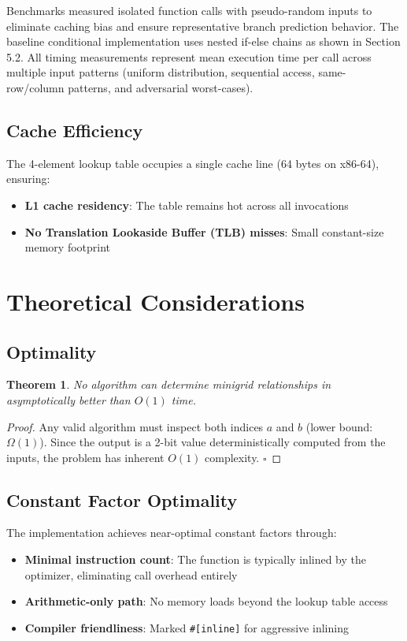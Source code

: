 \documentclass[11pt,a4paper]{article}
\newtheorem{theorem}{Theorem}
\begin{document}
Benchmarks measured isolated function calls with pseudo-random inputs to eliminate caching bias and ensure representative branch prediction behavior. The baseline conditional implementation uses nested if-else chains as shown in Section 5.2. All timing measurements represent mean execution time per call across multiple input patterns (uniform distribution, sequential access, same-row/column patterns, and adversarial worst-cases).

\subsection{Cache Efficiency}

The 4-element lookup table occupies a single cache line (64 bytes on x86-64), ensuring:
\begin{itemize}
    \item \textbf{L1 cache residency}: The table remains hot across all invocations
    \item \textbf{No Translation Lookaside Buffer (TLB) misses}: Small constant-size memory footprint
\end{itemize}

\section{Theoretical Considerations}

\subsection{Optimality}

\begin{theorem}
No algorithm can determine minigrid relationships in asymptotically better than $O(1)$ time.
\end{theorem}

\begin{proof}
Any valid algorithm must inspect both indices $a$ and $b$ (lower bound: $\Omega(1)$). Since the output is a 2-bit value deterministically computed from the inputs, the problem has inherent $O(1)$ complexity. $\square$
\end{proof}

\subsection{Constant Factor Optimality}

The implementation achieves near-optimal constant factors through:
\begin{itemize}
    \item \textbf{Minimal instruction count}: The function is typically inlined by the optimizer, eliminating call overhead entirely
    \item \textbf{Arithmetic-only path}: No memory loads beyond the lookup table access
    \item \textbf{Compiler friendliness}: Marked \texttt{\#[inline]} for aggressive inlining
\end{itemize}
\end{document}
